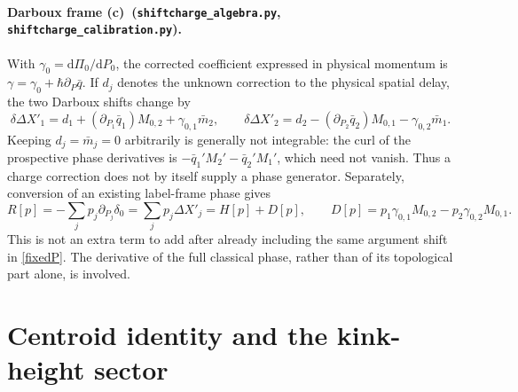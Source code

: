 \documentclass[11pt,a4paper]{article}
\newcommand{\C}{\textbf{(c)}\ }
\newcommand{\dd}{\mathrm d}
\newcommand{\file}[1]{\nolinkurl{#1}}
\newcommand{\alg}{\file{shiftcharge_algebra.py}}
\newcommand{\calcheck}{\file{shiftcharge_calibration.py}}
\begin{document}
\paragraph{Darboux frame \C (\alg, \calcheck).}
With $\gamma_0=\dd\Pi_0/\dd P_0$, the corrected coefficient expressed in
physical momentum is $\gamma=\gamma_0+\hbar\partial_P\bar q$.
If $d_j$ denotes the unknown correction to the physical spatial delay,
the two Darboux shifts change by
\begin{equation}
 \delta\Delta X'_1=d_1+(\partial_{P_1}\bar q_1)M_{0,2}
                         +\gamma_{0,1}\bar m_2,\qquad
 \delta\Delta X'_2=d_2-(\partial_{P_2}\bar q_2)M_{0,1}
                         -\gamma_{0,2}\bar m_1.\label{frame}
\end{equation}
Keeping $d_j=\bar m_j=0$ arbitrarily is generally not integrable: the curl
of the prospective phase derivatives is
$-\bar q_1'M_2'-\bar q_2'M_1'$, which need not vanish.
Thus a charge correction does not by itself supply a phase generator.
Separately, conversion of an existing label-frame phase gives
\begin{equation}
 R[p]=-\sum_jp_j\partial_{P_j}\delta_0
      =\sum_jp_j\Delta X'_j=H[p]+D[p],\qquad
 D[p]=p_1\gamma_{0,1}M_{0,2}-p_2\gamma_{0,2}M_{0,1}.\label{recoil}
\end{equation}
This is not an extra term to add after already including the same argument
shift in \eqref{fixedP}. The derivative of the full classical phase, rather
than of its topological part alone, is involved.

\section{Centroid identity and the kink-height sector}
\end{document}
